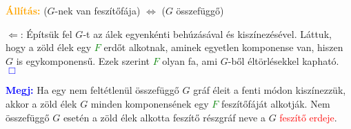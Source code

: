 \documentclass[../szamtud.tex]{subfiles}
\begin{document}
        \textcolor{orange}{\textbf{Állítás:}} ($G$-nek van feszítőfája) $\Longleftrightarrow$ ($G$ összefüggő)


        $\Leftarrow$: Építsük fel $G$-t az álek egyenkénti behúzásával és kiszínezésével. Láttuk, hogy a zöld élek egy \textcolor{green}{$F$} erdőt alkotnak, aminek egyetlen komponense van, hiszen $G$ is egykomponensű. Ezek szerint \textcolor{green}{$F$} olyan fa, ami $G$-ből éltörlésekkel kapható. \textcolor{blue}{$\Box$} 
    
        \textcolor{blue}{\textbf{Megj:}} Ha egy nem feltétlenül összefüggő $G$ gráf éleit a fenti módon kiszínezzük, akkor a zöld élek $G$ minden komponensének egy \textcolor{green}{$F$} feszítőfáját alkotják. Nem összefüggő $G$ esetén a zöld élek alkotta feszítő részgráf neve a $G$ \textcolor{red}{feszítő erdeje}.
\end{document}
